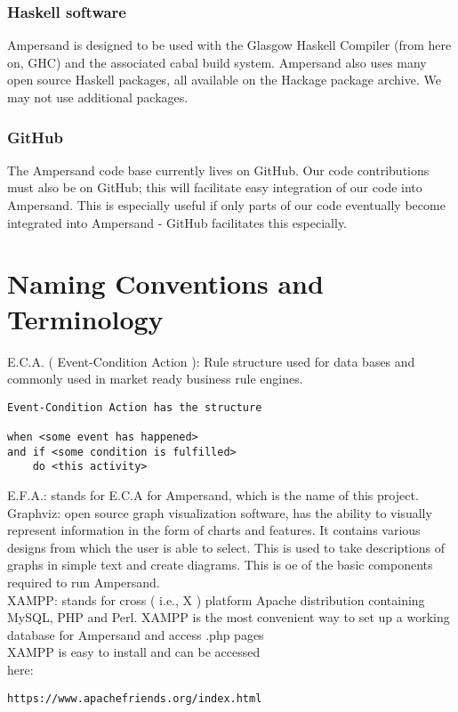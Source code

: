 \documentclass[12pt]{report}
\begin{document}
\subsubsection*{Haskell software}
Ampersand is designed to be used with the Glasgow Haskell Compiler (from here on, GHC) %
and the associated cabal build system. %
Ampersand also uses many open source Haskell packages, all available on the
Hackage package archive. %
We may not use additional packages. %


\subsubsection*{GitHub}
The Ampersand code base currently lives on GitHub. Our code contributions must
also be on GitHub; this will facilitate easy integration of our code into
Ampersand. This is especially useful if only parts of our code eventually become
integrated into Ampersand - GitHub facilitates this especially. 

\section{Naming Conventions and Terminology}\label{sec:Naming} 
E.C.A. \big( Event-Condition Action \big): Rule structure used for data bases 
and commonly used in market ready business rule engines. %
\begin{verbatim}
Event-Condition Action has the structure

when <some event has happened> 
and if <some condition is fulfilled> 
    do <this activity>

\end{verbatim} %
E.F.A.: stands for E.C.A for Ampersand, which is the name of this project. \\
Graphviz: open source graph visualization software, has the ability to visually 
represent information in the form of charts and features. It contains various 
designs from which the user is able to select. This is used to take 
descriptions of graphs in simple text and create diagrams. This is oe of the 
basic components required to run Ampersand.\\
XAMPP: stands for cross \big( i.e., X \big) platform Apache distribution 
containing MySQL, PHP and Perl. XAMPP is the most convenient way to set up a 
working database for Ampersand and access .php pages\\ XAMPP is easy to install 
and can be accessed \\
here: 
\begin{verbatim}
https://www.apachefriends.org/index.html
\end{verbatim} 
\end{document}
